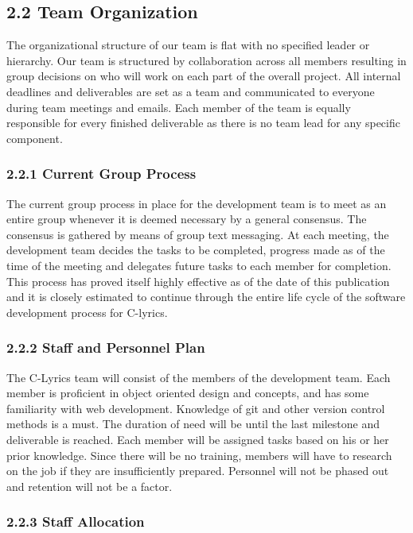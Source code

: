 \documentclass[]{article}
\begin{document}
\subsection{2.2 Team Organization}\label{team-organization}

The organizational structure of our team is flat with no specified
leader or hierarchy. Our team is structured by collaboration across all
members resulting in group decisions on who will work on each part of
the overall project. All internal deadlines and deliverables are set as
a team and communicated to everyone during team meetings and emails.
Each member of the team is equally responsible for every finished
deliverable as there is no team lead for any specific component.

\subsubsection{2.2.1 Current Group Process}\label{current-group-process}

The current group process in place for the development team is to meet
as an entire group whenever it is deemed necessary by a general
consensus. The consensus is gathered by means of group text messaging.
At each meeting, the development team decides the tasks to be completed,
progress made as of the time of the meeting and delegates future tasks
to each member for completion. This process has proved itself highly
effective as of the date of this publication and it is closely estimated
to continue through the entire life cycle of the software development
process for C-lyrics.

\subsubsection{2.2.2 Staff and Personnel
Plan}\label{staff-and-personnel-plan}

The C-Lyrics team will consist of the members of the development team.
Each member is proficient in object oriented design and concepts, and
has some familiarity with web development. Knowledge of git and other
version control methods is a must. The duration of need will be until
the last milestone and deliverable is reached. Each member will be
assigned tasks based on his or her prior knowledge. Since there will be
no training, members will have to research on the job if they are
insufficiently prepared. Personnel will not be phased out and retention
will not be a factor.

\subsubsection{2.2.3 Staff Allocation}\label{staff-allocation}
\end{document}
